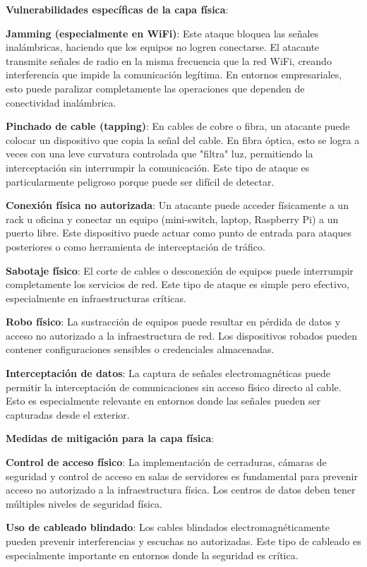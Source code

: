 \textbf{Vulnerabilidades específicas de la capa física}:

\textbf{Jamming (especialmente en WiFi)}: Este ataque bloquea las señales inalámbricas, haciendo que los equipos no logren conectarse. El atacante transmite señales de radio en la misma frecuencia que la red WiFi, creando interferencia que impide la comunicación legítima. En entornos empresariales, esto puede paralizar completamente las operaciones que dependen de conectividad inalámbrica.

\textbf{Pinchado de cable (tapping)}: En cables de cobre o fibra, un atacante puede colocar un dispositivo que copia la señal del cable. En fibra óptica, esto se logra a veces con una leve curvatura controlada que "filtra" luz, permitiendo la interceptación sin interrumpir la comunicación. Este tipo de ataque es particularmente peligroso porque puede ser difícil de detectar.

\textbf{Conexión física no autorizada}: Un atacante puede acceder físicamente a un rack u oficina y conectar un equipo (mini-switch, laptop, Raspberry Pi) a un puerto libre. Este dispositivo puede actuar como punto de entrada para ataques posteriores o como herramienta de interceptación de tráfico.

\textbf{Sabotaje físico}: El corte de cables o desconexión de equipos puede interrumpir completamente los servicios de red. Este tipo de ataque es simple pero efectivo, especialmente en infraestructuras críticas.

\textbf{Robo físico}: La sustracción de equipos puede resultar en pérdida de datos y acceso no autorizado a la infraestructura de red. Los dispositivos robados pueden contener configuraciones sensibles o credenciales almacenadas.

\textbf{Interceptación de datos}: La captura de señales electromagnéticas puede permitir la interceptación de comunicaciones sin acceso físico directo al cable. Esto es especialmente relevante en entornos donde las señales pueden ser capturadas desde el exterior.

\textbf{Medidas de mitigación para la capa física}:

\textbf{Control de acceso físico}: La implementación de cerraduras, cámaras de seguridad y control de acceso en salas de servidores es fundamental para prevenir acceso no autorizado a la infraestructura física. Los centros de datos deben tener múltiples niveles de seguridad física.

\textbf{Uso de cableado blindado}: Los cables blindados electromagnéticamente pueden prevenir interferencias y escuchas no autorizadas. Este tipo de cableado es especialmente importante en entornos donde la seguridad es crítica.

